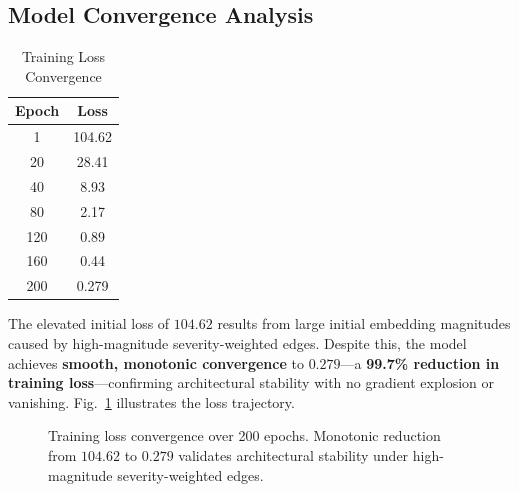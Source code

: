 \documentclass[conference]{IEEEtran}
\begin{document}
\subsection{Model Convergence Analysis}

\begin{table}[htbp]
  \centering
  \caption{Training Loss Convergence}
  \label{tab:convergence}
  \renewcommand{\arraystretch}{1.25}
  \begin{tabular}{cc}
    \toprule
    \textbf{Epoch} & \textbf{Loss} \\
    \midrule
      1   & 104.62 \\
     20   &  28.41 \\
     40   &   8.93 \\
     80   &   2.17 \\
    120   &   0.89 \\
    160   &   0.44 \\
    200   &   0.279 \\
    \bottomrule
  \end{tabular}
\end{table}

The elevated initial loss of $104.62$ results from large initial
embedding magnitudes caused by high-magnitude severity-weighted edges.
Despite this, the model achieves \textbf{smooth, monotonic convergence}
to $\mathbf{0.279}$---a \textbf{99.7\% reduction in training
loss}---confirming architectural stability with no gradient explosion
or vanishing. Fig.~\ref{fig:losscurve} illustrates the loss trajectory.

\begin{figure}[htbp]
  \centering
  \caption{Training loss convergence over 200 epochs.
    Monotonic reduction from $104.62$ to $0.279$
    validates architectural stability under high-magnitude
    severity-weighted edges.}
  \label{fig:losscurve}
\end{figure}
\end{document}

